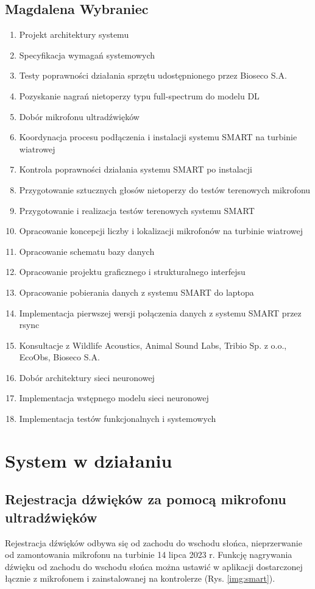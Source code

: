 \documentclass{sprz}
\begin{document}
\section{Magdalena Wybraniec}
\begin{enumerate}
  \item Projekt architektury systemu
  \item Specyfikacja wymagań systemowych
  \item Testy poprawności działania sprzętu udostępnionego przez Bioseco S.A.
  \item Pozyskanie nagrań nietoperzy typu full-spectrum do modelu DL
  \item Dobór mikrofonu ultradźwięków
  \item Koordynacja procesu podłączenia i instalacji systemu SMART na turbinie wiatrowej
  \item Kontrola poprawności działania systemu SMART po instalacji
  \item Przygotowanie sztucznych głosów nietoperzy do testów terenowych mikrofonu
  \item Przygotowanie i realizacja testów terenowych systemu SMART
  \item Opracowanie koncepcji liczby i lokalizacji mikrofonów na turbinie wiatrowej
  \item Opracowanie schematu bazy danych
  \item Opracowanie projektu graficznego i strukturalnego interfejsu
  \item Opracowanie pobierania danych z systemu SMART do laptopa
  \item Implementacja pierwszej wersji połączenia danych z systemu SMART przez rsync
  \item Konsultacje z Wildlife Acoustics, Animal Sound Labs, Tribio Sp. z o.o., EcoObs, Bioseco S.A.
  \item Dobór architektury sieci neuronowej
  \item Implementacja wstępnego modelu sieci neuronowej
  \item Implementacja testów funkcjonalnych i systemowych
\end{enumerate}

\chapter{System w działaniu}

\section{Rejestracja dźwięków za pomocą mikrofonu ultradźwięków}
Rejestracja dźwięków odbywa się od zachodu do wschodu słońca, nieprzerwanie od zamontowania mikrofonu na turbinie 14 lipca 2023 r. Funkcję nagrywania dźwięku od zachodu do wschodu słońca można ustawić w aplikacji dostarczonej łącznie z mikrofonem i zainstalowanej na kontrolerze (Rys. \ref{img:smart}).
\end{document}
